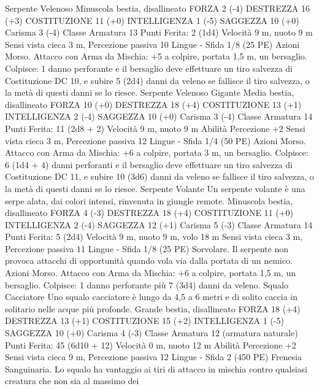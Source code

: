 \begin{multicols}{2}
Serpente Velenoso
Minuscola bestia, disallineato
FORZA 2 (-4)
DESTREZZA 16 (+3)
COSTITUZIONE 11 (+0)
INTELLIGENZA 1 (-5)
SAGGEZZA 10 (+0)
Carisma 3 (-4)
Classe Armatura 13
\hspace*{0pt}\hfill{Punti Ferita}: 2 (1d4)
Velocità 9 m, nuoto 9 m
Sensi vista cieca 3 m, Percezione passiva 10
Lingue -
Sfida 1/8 (25 PE)
Azioni
Morso. Attacco con Arma da Mischia: +5 a colpire, portata 1,5
m, un bersaglio.
Colpisce: 1 danno perforante e il bersaglio deve effettuare un tiro
salvezza di Costituzione DC 10, e subire 5 (2d4) danni da veleno
se fallisce il tiro salvezza, o la metà di questi danni se lo riesce.
Serpente Velenoso
Gigante
Media bestia, disallineato
FORZA 10 (+0)
DESTREZZA 18 (+4)
COSTITUZIONE 13 (+1)
INTELLIGENZA 2 (-4)
SAGGEZZA 10 (+0)
Carisma 3 (-4)
Classe Armatura 14
\hspace*{0pt}\hfill{Punti Ferita}: 11 (2d8 + 2)
Velocità 9 m, nuoto 9 m
Abilità Percezione +2
Sensi vista cieca 3 m, Percezione passiva 12
Lingue -
Sfida 1/4 (50 PE)
Azioni
Morso. Attacco con Arma da Mischia: +6 a colpire, portata 3 m,
un bersaglio.
Colpisce: 6 (1d4 + 4) danni perforanti e il bersaglio deve
effettuare un tiro salvezza di Costituzione DC 11, e subire 10
(3d6) danni da veleno se fallisce il tiro salvezza, o la metà di
questi danni se lo riesce.
Serpente Volante
Un serpente volante è una serpe alata, dai colori
intensi, rinvenuta in giungle remote.
Minuscola bestia, disallineato
FORZA 4 (-3)
DESTREZZA 18 (+4)
COSTITUZIONE 11 (+0)
INTELLIGENZA 2 (-4)
SAGGEZZA 12 (+1)
Carisma 5 (-3)
Classe Armatura 14
\hspace*{0pt}\hfill{Punti Ferita}: 5 (2d4)
Velocità 9 m, nuoto 9 m, volo 18 m
Sensi vista cieca 3 m, Percezione passiva 11
Lingue -
Sfida 1/8 (25 PE)
Sorvolare. Il serpente non provoca attacchi di opportunità
quando vola via dalla portata di un nemico.
Azioni
Morso. Attacco con Arma da Mischia: +6 a colpire, portata 1,5
m, un bersaglio.
Colpisce: 1 danno perforante più 7 (3d4) danni da veleno.
Squalo Cacciatore
Uno squalo cacciatore è lungo da 4,5 a 6 metri e di
solito caccia in solitario nelle acque più profonde.
Grande bestia, disallineato
FORZA 18 (+4)
DESTREZZA 13 (+1)
COSTITUZIONE 15 (+2)
INTELLIGENZA 1 (-5)
SAGGEZZA 10 (+0)
Carisma 4 (-3)
Classe Armatura 12 (armatura naturale)
\hspace*{0pt}\hfill{Punti Ferita}: 45 (6d10 + 12)
Velocità 0 m, nuoto 12 m
Abilità Percezione +2
Sensi vista cieca 9 m, Percezione passiva 12
Lingue -
Sfida 2 (450 PE)
Frenesia Sanguinaria. Lo squalo ha vantaggio ai tiri di attacco
in mischia contro qualsiasi creatura che non sia al massimo dei

\end{multicols}
